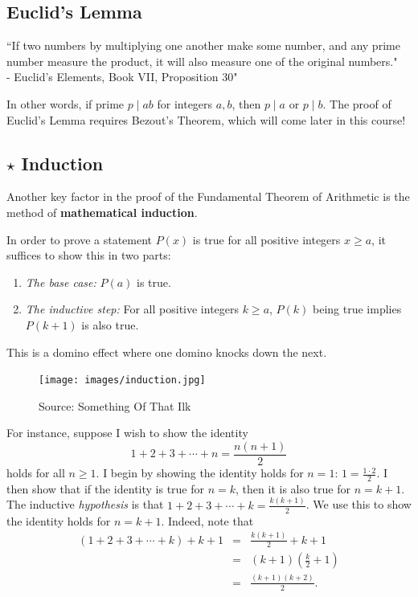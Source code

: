 \subsection{Euclid's Lemma}
\begin{displayquote} ``If two numbers by multiplying one another make some number, and any prime number measure the product, it will also measure one of the original numbers." \\ - Euclid's Elements, Book VII, Proposition 30" \end{displayquote}
In other words, if prime $p\mid ab$ for integers $a,b$, then $p\mid a$ or $p\mid b$. The proof of Euclid's Lemma requires Bezout's Theorem, which will come later in this course! 

\clearpage

\subsection{$\star$ Induction}
Another key factor in the proof of the Fundamental Theorem of Arithmetic is the method of \textbf{mathematical induction}.
	
\begin{defi}[Induction] In order to prove a statement $P(x)$ is true for all positive integers $x\ge a$, it suffices to show this in two parts: \begin{enumerate}
		\item \textit{The base case:} $P(a)$ is true.
		\item \textit{The inductive step:} For all positive integers $k\ge a$, $P(k)$ being true implies $P(k+1)$ is also true.
		\end{enumerate}  
		This is a domino effect where one domino knocks down the next.
\end{defi}

\clearpage

\begin{figure}[h]
	\centering\texttt{[image: images/induction.jpg]}
	\caption{Source: Something Of That Ilk}
\end{figure}
\clearpage

For instance, suppose I wish to show the identity $$1+2+3+\cdots+n=\frac{n(n+1)}{2}$$ holds for all $n\ge 1$.
I begin by showing the identity holds for $n=1$: $1=\frac{1\cdot 2}{2}$. I then show that if the identity is true for $n=k$, then it is also true for $n=k+1$. The inductive \textit{hypothesis} is that $1+2+3+\cdots+k=\frac{k(k+1)}{2}$. We use this to show the identity holds for $n=k+1$. Indeed, note that \begin{eqnarray*} \left(1+2+3+\cdots+k\right)+k+1 &=& \frac{k(k+1)}{2}+k+1 \\ &=& (k+1)\left(\frac{k}{2}+1\right) \\ &=& \frac{(k+1)(k+2)}{2}. \end{eqnarray*}

